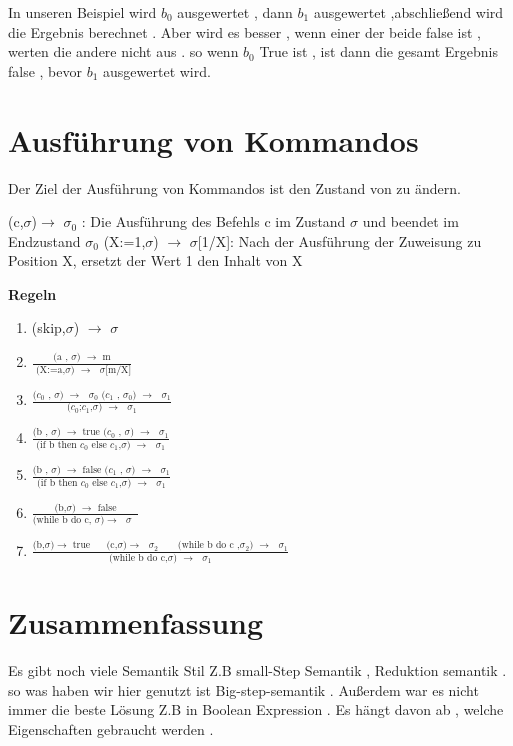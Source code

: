 \documentclass[a4paper,12pt,twoside,headsepline]{scrartcl}
\begin{document}
In unseren Beispiel wird $b_0$ ausgewertet , dann $b_1$ ausgewertet ,abschließend wird die Ergebnis berechnet . 
Aber wird es besser , wenn einer der beide false ist , werten die andere nicht aus . so wenn $b_0$ True ist , ist dann die gesamt Ergebnis false , bevor $b_1$ ausgewertet wird. 

\section{Ausführung von Kommandos}  
 Der Ziel der Ausführung von Kommandos ist den Zustand von  zu ändern.

(c,$\sigma$)$\to$ $\sigma_0$  : Die Ausführung des Befehls c im Zustand $\sigma$ und  beendet im Endzustand $\sigma_0$
(X:=1,$\sigma$) $\to$ $\sigma$[1/X]: Nach der Ausführung der Zuweisung zu Position X, ersetzt der Wert 1 den Inhalt von X

\textbf{Regeln}
\begin{enumerate}
	\item (skip,$\sigma$) $\to$ $\sigma$
	\item $\frac  {\text {(a , $\sigma$) $\to$ m} } { \text{ (X:=a,$\sigma$) $\to$ $\sigma$[m/X]} }$
	\item  $\frac  {\text {($c_0$ , $\sigma$) $\to$ $\sigma_0$   ($c_1$ , $\sigma_0$) $\to$ $\sigma_1$} } { \text{($c_0$;$c_1$,$\sigma$) $\to$ $\sigma_1$} }$
	\item $\frac  {\text {(b , $\sigma$) $\to$ true   ($c_0$ , $\sigma$) $\to$ $\sigma_1$} } { \text{(if b then $c_0$ else $c_1$,$\sigma$) $\to$ $\sigma_1$} }$
	\item $\frac  {\text {(b , $\sigma$) $\to$ false   ($c_1$ , $\sigma$) $\to$ $\sigma_1$} } { \text{(if b then $c_0$ else $c_1$,$\sigma$) $\to$ $\sigma_1$} }$
	\item $\frac {\text{(b,$\sigma$) $\to$ false}} {\text{(while b do c, $\sigma$)$\to$ $\sigma$ }}$
	\item $\frac {\text{(b,$\sigma$)$\to$ true $\quad$ (c,$\sigma$)$\to$ $\sigma_2$  $\quad$ (while b do c ,$\sigma_2$) $\to$ $\sigma_1$}}{\text{(while b do c,$\sigma$) $\to$ $\sigma_1$}}$   
	              
      \end{enumerate}
  
  \section{Zusammenfassung}
  Es gibt noch viele Semantik Stil Z.B small-Step Semantik , Reduktion semantik .
  so was haben wir hier genutzt ist Big-step-semantik . Außerdem war es nicht immer die beste Lösung Z.B in Boolean Expression . Es hängt davon ab , welche Eigenschaften  gebraucht werden . 
  
\end{document}
